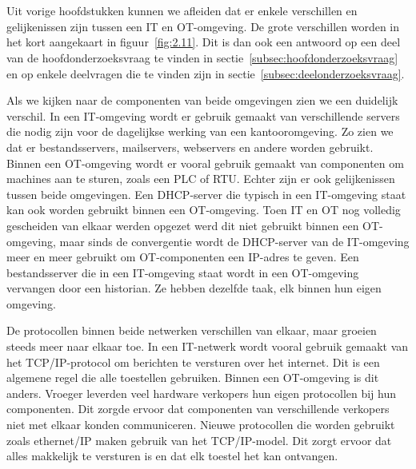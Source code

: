 \section{}
\label{sec:Vergelijking IT en OT}
Uit vorige hoofdstukken kunnen we afleiden dat er enkele verschillen en gelijkenissen zijn tussen een IT en OT-omgeving. De grote verschillen worden in het kort aangekaart in figuur~\ref{fig:2.11}. Dit is dan ook een antwoord op een deel van de hoofdonderzoeksvraag te vinden in sectie~\ref{subsec:hoofdonderzoeksvraag} en op enkele deelvragen die te vinden zijn in sectie~\ref{subsec:deelonderzoeksvraag}.

Als we kijken naar de componenten van beide omgevingen zien we een duidelijk verschil. In een IT-omgeving wordt er gebruik gemaakt van verschillende servers die nodig zijn voor de dagelijkse werking van een kantooromgeving. Zo zien we dat er bestandsservers, mailservers, webservers en andere worden gebruikt. Binnen een OT-omgeving wordt er vooral gebruik gemaakt van componenten om machines aan te sturen, zoals een PLC of RTU. Echter zijn er ook gelijkenissen tussen beide omgevingen. Een DHCP-server die typisch in een IT-omgeving staat kan ook worden gebruikt binnen een OT-omgeving. Toen IT en OT nog volledig gescheiden van elkaar werden opgezet werd dit niet gebruikt binnen een OT-omgeving, maar sinds de convergentie wordt de DHCP-server van de IT-omgeving meer en meer gebruikt om OT-componenten een IP-adres te geven. Een bestandsserver die in een IT-omgeving staat wordt in een OT-omgeving vervangen door een historian. Ze hebben dezelfde taak, elk binnen hun eigen omgeving. 

De protocollen binnen beide netwerken verschillen van elkaar, maar groeien steeds meer naar elkaar toe. In een IT-netwerk wordt vooral gebruik gemaakt van het TCP/IP-protocol om berichten te versturen over het internet. Dit is een algemene regel die alle toestellen gebruiken. Binnen een OT-omgeving is dit anders. Vroeger leverden veel hardware verkopers hun eigen protocollen bij hun componenten. Dit zorgde ervoor dat componenten van verschillende verkopers niet met elkaar konden communiceren. Nieuwe protocollen die worden gebruikt zoals ethernet/IP maken gebruik van het TCP/IP-model. Dit zorgt ervoor dat alles makkelijk te versturen is en dat elk toestel het kan ontvangen.

